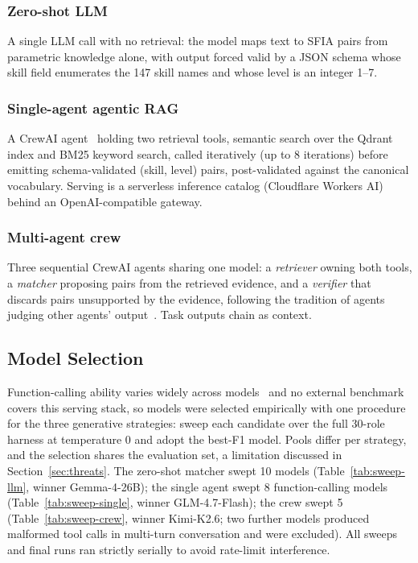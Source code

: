 \documentclass[conference]{IEEEtran}
\begin{document}
\subsubsection{Zero-shot LLM} A single LLM call with no retrieval: the model maps text to SFIA pairs from parametric knowledge alone, with output forced valid by a JSON schema whose skill field enumerates the 147 skill names and whose level is an integer 1--7.

\subsubsection{Single-agent agentic RAG} A CrewAI agent~\cite{moura2023crewai} holding two retrieval tools, semantic search over the Qdrant index and BM25 keyword search, called iteratively (up to 8 iterations) before emitting schema-validated (skill, level) pairs, post-validated against the canonical vocabulary. Serving is a serverless inference catalog (Cloudflare Workers AI) behind an OpenAI-compatible gateway.

\subsubsection{Multi-agent crew} Three sequential CrewAI agents sharing one model: a \emph{retriever} owning both tools, a \emph{matcher} proposing pairs from the retrieved evidence, and a \emph{verifier} that discards pairs unsupported by the evidence, following the tradition of agents judging other agents' output~\cite{du2024debate,chan2024chateval}. Task outputs chain as context.

\subsection{Model Selection}
Function-calling ability varies widely across models~\cite{patil2025bfcl} and no external benchmark covers this serving stack, so models were selected empirically with one procedure for the three generative strategies: sweep each candidate over the full 30-role harness at temperature 0 and adopt the best-F1 model. Pools differ per strategy, and the selection shares the evaluation set, a limitation discussed in Section~\ref{sec:threats}. The zero-shot matcher swept 10 models (Table~\ref{tab:sweep-llm}, winner Gemma-4-26B); the single agent swept 8 function-calling models (Table~\ref{tab:sweep-single}, winner GLM-4.7-Flash); the crew swept 5 (Table~\ref{tab:sweep-crew}, winner Kimi-K2.6; two further models produced malformed tool calls in multi-turn conversation and were excluded). All sweeps and final runs ran strictly serially to avoid rate-limit interference.
\end{document}
